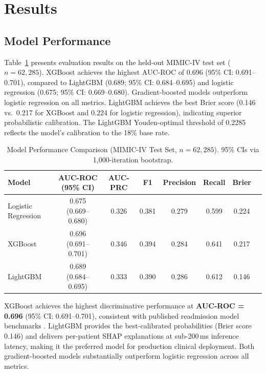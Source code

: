 \documentclass[11pt,letterpaper]{article}
\begin{document}
\section{Results}
\label{sec:results}

\subsection{Model Performance}

Table~\ref{tab:performance} presents evaluation results on the held-out MIMIC-IV test set ($n = 62{,}285$). XGBoost achieves the highest AUC-ROC of 0.696 (95\% CI: 0.691--0.701), compared to LightGBM (0.689; 95\% CI: 0.684--0.695) and logistic regression (0.675; 95\% CI: 0.669--0.680). Gradient-boosted models outperform logistic regression on all metrics. LightGBM achieves the best Brier score (0.146 vs.\ 0.217 for XGBoost and 0.224 for logistic regression), indicating superior probabilistic calibration. The LightGBM Youden-optimal threshold of 0.2285 reflects the model's calibration to the 18\% base rate.

\begin{table}[H]
\centering
\caption{Model Performance Comparison (MIMIC-IV Test Set, $n = 62{,}285$). 95\% CIs via 1,000-iteration bootstrap.}
\label{tab:performance}
\begin{tabular}{lccccccc}
\toprule
\textbf{Model} & \textbf{AUC-ROC (95\% CI)} & \textbf{AUC-PRC} & \textbf{F1} & \textbf{Precision} & \textbf{Recall} & \textbf{Brier} \\
\midrule
Logistic Regression & 0.675 (0.669--0.680) & 0.326 & 0.381 & 0.279 & 0.599 & 0.224 \\
XGBoost             & 0.696 (0.691--0.701) & 0.346 & 0.394 & 0.284 & 0.641 & 0.217 \\
LightGBM            & 0.689 (0.684--0.695) & 0.333 & 0.390 & 0.286 & 0.612 & 0.146 \\
\bottomrule
\end{tabular}
\end{table}

\begin{resultbox}[title={Key Result: Predictive Performance}]
XGBoost achieves the highest discriminative performance at \textbf{AUC-ROC = 0.696} (95\% CI: 0.691--0.701), consistent with published readmission model benchmarks \citep{kansagara2011risk}. LightGBM provides the best-calibrated probabilities (Brier score 0.146) and delivers per-patient SHAP explanations at sub-200\,ms inference latency, making it the preferred model for production clinical deployment. Both gradient-boosted models substantially outperform logistic regression across all metrics.
\end{resultbox}
\end{document}
